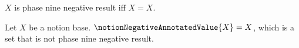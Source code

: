 

\begin{definition}\label{notion_negative_result_property}
    $X$ is phase nine negative result iff $X=X$.
\end{definition}

\begin{definition}\label{notion_negative_annotated_value}
    Let $X$ be a notion base.
    $\notionNegativeAnnotatedValue{X}=X$, which is a set
        that is not phase nine negative result.
\end{definition}
